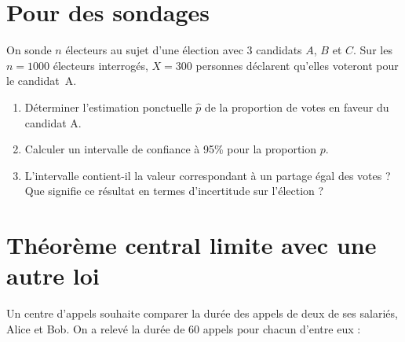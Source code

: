    \vspace{0.1cm}

\section*{Pour des sondages}
On sonde $n$ électeurs au sujet d'une élection avec $3$ candidats $A$, $B$ et $C$. \newline
Sur les $n = 1000$ électeurs interrogés, $X = 300$ personnes déclarent qu'elles voteront pour le candidat~A.

\begin{enumerate}
    \item Déterminer l'estimation ponctuelle $\hat{p}$ de la proportion de votes en faveur du candidat A.
    \item Calculer un intervalle de confiance à 95\% pour la proportion $p$. 
    \item L'intervalle contient-il la valeur correspondant à un partage égal des votes ? 
    Que signifie ce résultat en termes d'incertitude sur l'élection ?
\end{enumerate}

\vspace{1cm}



\section*{Théorème central limite avec une autre loi}
   Un centre d'appels souhaite comparer la durée des appels de deux de ses salariés, Alice et Bob. 
On a relevé la durée de 60 appels pour chacun d'entre eux :

